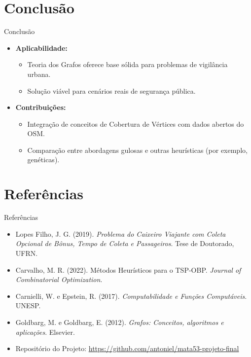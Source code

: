 \documentclass[aspectratio=169,xcolor=table]{beamer}
\begin{document}
\section{Conclusão}
\begin{frame}{Conclusão}
    \begin{itemize}
        \item \textbf{Aplicabilidade:}
        \begin{itemize}
            \item Teoria dos Grafos oferece base sólida para problemas de vigilância urbana.
            \item Solução viável para cenários reais de segurança pública.
        \end{itemize}
        \item \textbf{Contribuições:}
        \begin{itemize}
            \item Integração de conceitos de Cobertura de Vértices com dados abertos do OSM.
            \item Comparação entre abordagens gulosas e outras heurísticas (por exemplo, genéticas).
        \end{itemize}
    \end{itemize}
\end{frame}

\section{Referências}
\begin{frame}{Referências}
    \begin{itemize}
        \item Lopes Filho, J. G. (2019). \emph{Problema do Caixeiro Viajante com Coleta Opcional de Bônus, Tempo de Coleta e Passageiros}. Tese de Doutorado, UFRN.
        \item Carvalho, M. R. (2022). Métodos Heurísticos para o TSP-OBP. \emph{Journal of Combinatorial Optimization}.
        \item Carnielli, W. e Epstein, R. (2017). \emph{Computabilidade e Funções Computáveis}. UNESP.
        \item Goldbarg, M. e Goldbarg, E. (2012). \emph{Grafos: Conceitos, algoritmos e aplicações}. Elsevier.
        \item Repositório do Projeto: \url{https://github.com/antoniel/mata53-projeto-final}
    \end{itemize}
\end{frame}
\end{document}
